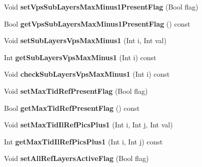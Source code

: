 \begin{DoxyCompactItemize}
\item 
\mbox{\label{class_t_com_v_p_s_a0bfbe3bf9a9d2ed0fbb90ab78caa41b5}} 
Void {\bfseries set\+Vps\+Sub\+Layers\+Max\+Minus1\+Present\+Flag} (Bool flag)
\item 
\mbox{\label{class_t_com_v_p_s_a60e3defe3d826f900aaeeb0ddfdfc381}} 
Bool {\bfseries get\+Vps\+Sub\+Layers\+Max\+Minus1\+Present\+Flag} () const
\item 
\mbox{\label{class_t_com_v_p_s_a023d6536486054c533dcd7cfa4af1676}} 
Void {\bfseries set\+Sub\+Layers\+Vps\+Max\+Minus1} (Int i, Int val)
\item 
\mbox{\label{class_t_com_v_p_s_a92f0a7c74228c15e6d67806f78b9f20c}} 
Int {\bfseries get\+Sub\+Layers\+Vps\+Max\+Minus1} (Int i) const
\item 
\mbox{\label{class_t_com_v_p_s_a6f19f2733083f476a4745a008a7170ed}} 
Void {\bfseries check\+Sub\+Layers\+Vps\+Max\+Minus1} (Int i) const
\item 
\mbox{\label{class_t_com_v_p_s_a5acb445dc1bc9b2f7472d9433fc216f1}} 
Void {\bfseries set\+Max\+Tid\+Ref\+Present\+Flag} (Bool flag)
\item 
\mbox{\label{class_t_com_v_p_s_a54ae38ef1fbaef99394a97a37073c8f5}} 
Bool {\bfseries get\+Max\+Tid\+Ref\+Present\+Flag} () const
\item 
\mbox{\label{class_t_com_v_p_s_a3cc14bea2daaf17399b88aa75f280c27}} 
Void {\bfseries set\+Max\+Tid\+Il\+Ref\+Pics\+Plus1} (Int i, Int j, Int val)
\item 
\mbox{\label{class_t_com_v_p_s_aa7876481cec8f13b9c33811404acab3f}} 
Int {\bfseries get\+Max\+Tid\+Il\+Ref\+Pics\+Plus1} (Int i, Int j) const
\item 
\mbox{\label{class_t_com_v_p_s_a05c651b784bc0f453e398891ed7e716e}} 
Void {\bfseries set\+All\+Ref\+Layers\+Active\+Flag} (Bool flag)
\item 
\mbox{\label{class_t_com_v_p_s_a046c562d41c926377bf7696bbfc6143f}} 

\end{DoxyCompactItemize}

